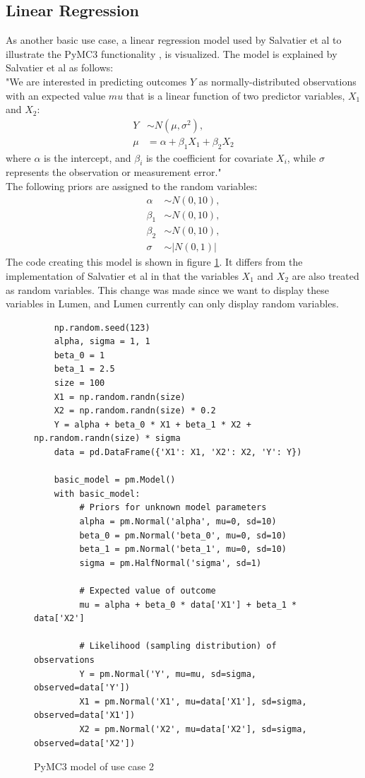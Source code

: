 \documentclass{article}
\begin{document}
\subsection{Linear Regression}
As another basic use case, a linear regression model used by Salvatier et al to illustrate the PyMC3 functionality \cite{Salvatier2016}, is visualized. 
The model is explained by Salvatier et al as follows:\\
"We are interested in predicting outcomes $Y$ as normally-distributed observations with an expected value $mu$ that is a linear function of two predictor variables, $X_1$ and $X_2$:
\begin{equation}
\begin{split}
Y &\sim N(\mu,\sigma^2), \\
\mu &= \alpha + \beta_1 X_1 + \beta_2 X_2
\end{split}
\end{equation}
where $\alpha$ is the intercept, and $\beta_i$ is the coefficient for covariate $X_i$, while $\sigma$ represents the observation or measurement error."\\
The following priors are assigned to the random variables:
\begin{equation}
\begin{split}
\alpha &\sim N(0,10), \\
\beta_1 &\sim N(0,10), \\
\beta_2 &\sim N(0,10), \\
\sigma &\sim |N(0,1)|
\end{split}
\end{equation}
The code creating this model is shown in figure \ref{fig:code_use_case_2}. It differs from the implementation of Salvatier et al in that the variables $X_1$ and $X_2$ are also treated as random variables. This change was made since we want to display these variables in Lumen, and Lumen currently can only display random variables.
\begin{figure}[h]
	\begin{lstlisting}
	np.random.seed(123)
	alpha, sigma = 1, 1
	beta_0 = 1
	beta_1 = 2.5
	size = 100
	X1 = np.random.randn(size)
	X2 = np.random.randn(size) * 0.2
	Y = alpha + beta_0 * X1 + beta_1 * X2 + np.random.randn(size) * sigma
	data = pd.DataFrame({'X1': X1, 'X2': X2, 'Y': Y})
	
	basic_model = pm.Model()
	with basic_model:
	     # Priors for unknown model parameters
	     alpha = pm.Normal('alpha', mu=0, sd=10)
	     beta_0 = pm.Normal('beta_0', mu=0, sd=10)
	     beta_1 = pm.Normal('beta_1', mu=0, sd=10)
	     sigma = pm.HalfNormal('sigma', sd=1)
	
	     # Expected value of outcome
	     mu = alpha + beta_0 * data['X1'] + beta_1 * data['X2']
	
	     # Likelihood (sampling distribution) of observations
	     Y = pm.Normal('Y', mu=mu, sd=sigma, observed=data['Y'])
	     X1 = pm.Normal('X1', mu=data['X1'], sd=sigma, observed=data['X1'])
	     X2 = pm.Normal('X2', mu=data['X2'], sd=sigma, observed=data['X2'])
	\end{lstlisting}
	\caption[PyMC3 model of use case 2]{PyMC3 model of use case 2}
	\label{fig:code_use_case_2}
\end{figure}
\end{document}

